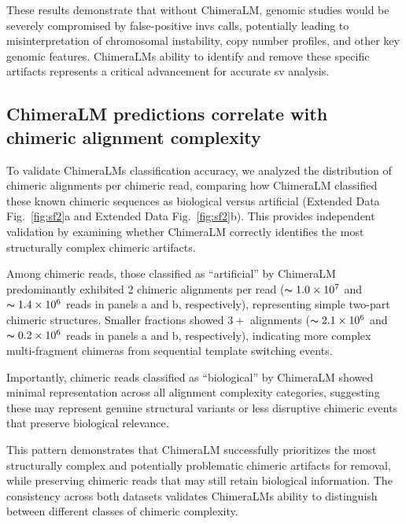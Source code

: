 \documentclass[pdflatex,sn-nature]{sn-jnl}%
\theoremstyle{thmstyleone}%
\theoremstyle{thmstyletwo}%
\theoremstyle{thmstylethree}%
\begin{document}
These results demonstrate that without ChimeraLM, genomic studies would be severely compromised by false-positive \glspl{inv} calls, potentially leading to misinterpretation of chromosomal instability, copy number profiles, and other key genomic features.
ChimeraLM\textquotesingle s ability to identify and remove these specific artifacts represents a critical advancement for accurate \gls{sv} analysis.

\subsection*{ChimeraLM predictions correlate with chimeric alignment complexity}

To validate ChimeraLM\textquotesingle s classification accuracy, we analyzed the distribution of chimeric alignments per chimeric read, comparing how ChimeraLM classified these known chimeric sequences as biological versus artificial (Extended Data Fig.~\ref{fig:sf2}a and Extended Data Fig.~\ref{fig:sf2}b).
This provides independent validation by examining whether ChimeraLM correctly identifies the most structurally complex chimeric artifacts.

Among chimeric reads, those classified as ``artificial'' by ChimeraLM predominantly exhibited 2 chimeric alignments per read ($\thicksim 1.0 \times 10^7$ and $\thicksim 1.4 \times 10^6$ reads in panels a and b, respectively), representing simple two-part chimeric structures.
Smaller fractions showed $3+$ alignments ($\thicksim 2.1 \times 10^6$ and $\thicksim 0.2 \times 10^6$ reads in panels a and b, respectively), indicating more complex multi-fragment chimeras from sequential template switching events.

Importantly, chimeric reads classified as ``biological'' by ChimeraLM showed minimal representation across all alignment complexity categories, suggesting these may represent genuine structural variants or less disruptive chimeric events that preserve biological relevance.

This pattern demonstrates that ChimeraLM successfully prioritizes the most structurally complex and potentially problematic chimeric artifacts for removal, while preserving chimeric reads that may still retain biological information.
The consistency across both datasets validates ChimeraLM\textquotesingle s ability to distinguish between different classes of chimeric complexity.
\end{document}
